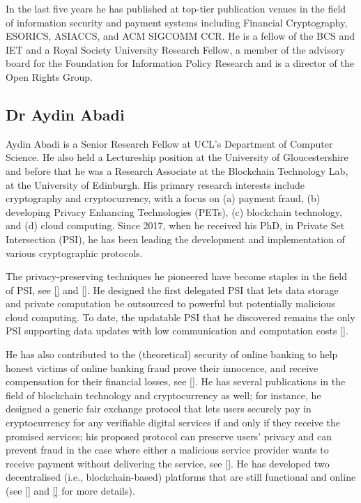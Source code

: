 In the last five years he has published at top-tier publication venues in the field of information security and payment systems including Financial Cryptography, ESORICS, ASIACCS, and ACM SIGCOMM CCR. He is a fellow of the BCS and IET and a Royal Society University Research Fellow, a member of the advisory board for the Foundation for Information Policy Research and is a director of the Open Rights Group.

\subsection{Dr Aydin Abadi}


Aydin Abadi is a Senior Research Fellow at UCL’s Department of Computer Science.  He also held a Lectureship position at the University of Gloucestershire and before that he was a Research Associate at the Blockchain Technology Lab, at the University of Edinburgh. His primary research interests include cryptography and cryptocurrency, with a focus on (a) payment fraud, (b) developing Privacy Enhancing Technologies (PETs), (c) blockchain technology, and (d) cloud computing. Since 2017, when he received his PhD, in Private Set Intersection (PSI), he has been leading the development and implementation of various cryptographic protocols. 

The privacy-preserving techniques he pioneered have become staples in the field of PSI, see \href{https://link.springer.com/chapter/10.1007/978-3-319-18467-8_1}{[\x]} and \href{https://link.springer.com/chapter/10.1007/978-3-662-54970-4_9}{[\x]}. He designed the first delegated PSI that lets data storage and private computation be outsourced to powerful but potentially malicious cloud computing. To date, the updatable PSI that he discovered remains the only PSI supporting data updates with low communication and computation costs \href{https://link.springer.com/chapter/10.1007/978-3-031-18283-9_6}{[\x]}.  


He has also contributed to the (theoretical) security of online banking to help honest victims of online banking fraud prove their innocence, and receive compensation for their financial losses, see \href{https://eprint.iacr.org/2022/107.pdf}{[\x]}. He has several publications in the field of blockchain technology and cryptocurrency as well; for instance, he designed a generic fair exchange protocol that lets users securely pay in cryptocurrency for any verifiable digital services if and only if they receive the promised services; his proposed protocol can preserve users' privacy and can prevent fraud in the case where either a malicious service provider wants to receive payment without delivering the service, see \href{https://arxiv.org/pdf/2208.00283.pdf}{[\x]}. He has developed two decentralised (i.e., blockchain-based) platforms that are still functional and online (see \href{http://blockchainlab.inf.ed.ac.uk/id-management/#/}{[\x]} and \href{http://blockchainlab.inf.ed.ac.uk/valued/}{[\x]} for more details).



